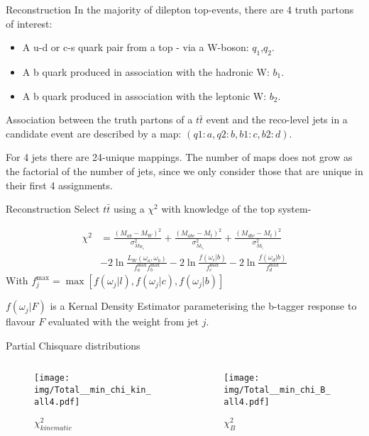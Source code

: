 \documentclass{beamer}
\begin{document}
\begin{frame}{Reconstruction}
  In the majority of dilepton top-events, there are 4 truth partons of interest:
  \begin{itemize}
    \item A u-d or c-s quark pair from a top - via a W-boson: $q_{1}$,$q_{2}$.
    \item A b quark produced in association with the hadronic W: $b_{1}$.
    \item A b quark produced in association with the leptonic W: $b_{2}$.
  \end{itemize}
  Association between the truth partons of a $t \bar{t}$ event and the reco-level jets in a candidate event are described by a map: $\left(q1:a, q2:b, b1:c, b2:d\right)$.

  For 4 jets there are 24-unique mappings. The number of maps does not grow as the factorial of the number of jets, since we only consider those that are unique in their first 4 assignments.
\end{frame}

\begin{frame}{Reconstruction}
Select $t\bar{t}$ using a $\chi^2$ with knowledge of the top system-

\begin{equation}\begin{split}
  \chi^2 &= \frac{\left(M_{ab} - M_W\right)^2}{\sigma^2_{M_{W_h}}} + \frac{\left(M_{abc} - M_t\right)^2}{\sigma^2_{M_{t_h}}} + \frac{\left(M_{dl\nu} - M_t\right)^2}{\sigma^2_{M_{t_l}}} \\
  &-2\ln{\frac{L_{W}\left( \omega_{a},\omega_{b} \right)}{f^{\text{max}}_{a} f^{\text{max}}_{b}}} -2\ln{\frac{f\left(\omega_{c} \big| b\right)}{f^{\text{max}}_{c}}} -2\ln{\frac{f\left(\omega_{d} \big| b\right)}{f^{\text{max}}_{d}}}
\end{split}\end{equation}
With $f^{\text{max}}_j = \max\left[f\left(\omega_{j} \big| l\right), f\left(\omega_{j} \big| c\right), f\left(\omega_{j} \big| b\right)\right]$

$f\left( \omega_{j} \big| F\right)$ is a Kernal Density Estimator parameterising the b-tagger response to flavour $F$ evaluated with the weight from jet $j$.
\end{frame}

\begin{frame}{Partial Chisquare distributions}
  \begin{columns}
    \begin{column}{0.45\textwidth}\begin{figure}
      \caption{$\chi^2_{kinematic}$}
      \texttt{[image: img/Total\_\_min\_chi\_kin\_all4.pdf]}
    \end{figure}\end{column}
    \begin{column}{0.45\textwidth}\begin{figure}
      \caption{$\chi^2_{B}$}
      \texttt{[image: img/Total\_\_min\_chi\_B\_all4.pdf]}
    \end{figure}\end{column}
  \end{columns}
\end{frame}
\end{document}
